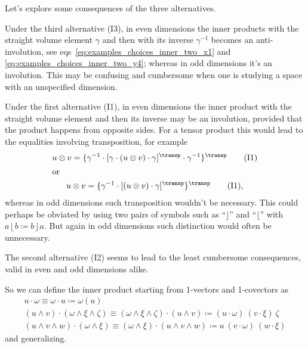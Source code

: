 \documentclass[\ifafour a4paper,12pt,\else a5paper,10pt,\fi%
onecolumn,oneside,article,%
british%
]{memoir}
\theoremstyle{remark}
\theoremstyle{innote}
\newcommand*{\defd}{\coloneqq}
\renewcommand*{\|}[1][]{\nonscript\:#1\vert\nonscript\:\mathopen{}}
\newcommand*{\eqns}{eqs}%
\newcommand*{\T}{^\transp}%
\newcommand*{\ii}{\mathbin{\rfloor}}
\newcommand*{\rii}{\mathbin{\lfloor}}
\begin{document}
Let's explore some consequences of the three alternatives.

Under the third alternative (I3), in even dimensions the inner products
with the straight volume element $\gamma$ and then with its inverse
$\gamma^{-1}$ becomes an anti-involution, see
\eqns~\eqref{eq:examples_choices_inner_two_x1} and
\eqref{eq:examples_choices_inner_two_y4}; whereas in odd dimensions it's an
involution. This may be confusing and cumbersome when one is studying a
space with an unspecified dimension.

Under the first alternative (I1), in even dimensions the inner product with
the straight volume element and then its inverse may be an involution,
provided that the product happens from opposite sides. For a tensor product
this would lead to the equalities involving transposition, for example
\begin{gather}
  \label{eq:example_invol_transp}
  u \otimes v =
  \{ \gamma^{-1} \cdot
  [\gamma \cdot (u \otimes v) \cdot \gamma]\T
  \cdot \gamma^{-1} \}\T
  \qquad\text{(I1)}
  \\\shortintertext{or}
  u \otimes v =
  \{ \gamma^{-1} \cdot
  [(u \otimes v) \cdot \gamma]\T 
\}\T  \qquad\text{(I1)},
\end{gather}
whereas in odd dimensions such transposition wouldn't be necessary. This
could perhaps be obviated by using two pairs of symbols such as
\enquote{$\ii$} and \enquote{$\rii$} with $a \rii b \defd b \ii a$. But
again in odd dimensions such distinction would often be unnecessary.

The second alternative (I2) seems to lead to the least cumbersome
consequences, valid in even and odd dimensions alike.

So we can define the inner product starting from 1-vectors and 1-covectors as
\begin{equation}
  \label{eq:inner_prod_final_def}
  \begin{gathered}
    u \cdot \omega \equiv \omega \cdot u \defd \omega(u)
    \\
    (u \land v) \cdot (\omega \land \xi \land \zeta) \equiv
    (\omega \land \xi \land \zeta) \cdot (u \land v)
    \defd (u \cdot \omega)\ (v \cdot \xi)\ \zeta
    \\
    (u \land v \land w) \cdot (\omega \land \xi) \equiv
    (\omega \land \xi) \cdot (u \land v \land w)
    \defd u\ (v \cdot \omega)\ (w \cdot \xi)
\end{gathered}
\end{equation}
and generalizing.
\end{document}
